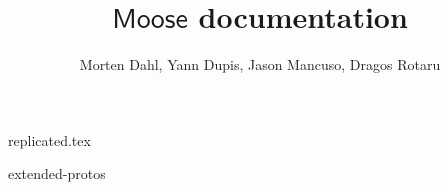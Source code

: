 \documentclass{article}
\begin{document}
%
\newcommand{\mainsection}[1]{\newpage \section{#1}}
\newcommand{\msubsection}[1]{\newpage \subsection{#1}}
\newcommand{\msubsubsection}[1]{\subsubsection{#1}}

\title{$\mathsf{Moose}$ documentation}
\author{Morten Dahl, Yann Dupis, Jason Mancuso, Dragos Rotaru}


\maketitle
\tableofcontents

\thispagestyle{fancy}




{replicated.tex}


\newpage
%



\clearpage
\appendix


{extended-protos}
\end{document}
